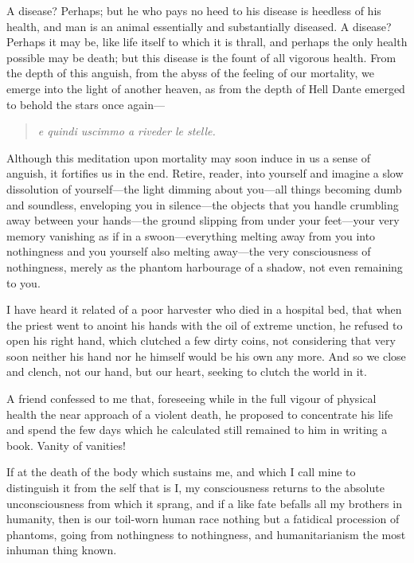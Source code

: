 A disease? Perhaps; but he who pays no heed to his disease is heedless
of his health, and man is an animal essentially and substantially
diseased. A disease? Perhaps it may be, like life itself to which it
is thrall, and perhaps the only health possible may be death; but this
disease is the fount of all vigorous health. From the depth of this
anguish, from the abyss of the feeling of our mortality, we emerge
into the light of another  heaven, as from the depth of Hell
Dante emerged to behold the stars once again---

\begin{quote} \textit{e quindi uscimmo a riveder le stelle.}
\end{quote}

Although this meditation upon mortality may soon induce in us a sense
of anguish, it fortifies us in the end. Retire, reader, into yourself
and imagine a slow dissolution of your\-self---the light dimming about
you---all things becoming dumb and soundless, enveloping you in
silence---the objects that you handle crumbling away between your
hands---the ground slipping from under your feet---your very memory
vanishing as if in a swoon---eve\-ry\-thing melting away from you into
nothingness and you yourself also melting a\-way---the very
consciousness of nothingness, merely as the phantom harbourage of a
shadow, not even remaining to you.

I have heard it related of a poor harvester who died in a hospital
bed, that when the priest went to anoint his hands with the oil of
extreme unction, he refused to open his right hand, which clutched a
few dirty coins, not considering that very soon neither his hand nor
he himself would be his own any more. And so we close and clench, not
our hand, but our heart, seeking to clutch the world in it.

A friend confessed to me that, foreseeing while in the full vigour of
physical health the near approach of a violent death, he proposed to
concentrate his life and spend the few days which he calculated still
remained to him in writing a book. Vanity of vanities!

If at the death of the body which sustains me, and which I call mine
to distinguish it from the self that is I, my consciousness returns to
the absolute unconsciousness from which it sprang, and if a like fate
befalls all my brothers in humanity, then is our toil-worn human race
nothing but a fatidical procession of phantoms, going from nothingness
to nothingness, and humanitarianism the most inhuman thing known.

